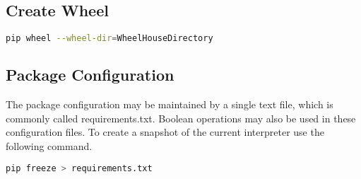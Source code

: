 \subsection{Create Wheel}
\begin{lstlisting}[language=bash, numbers=none]
pip wheel --wheel-dir=WheelHouseDirectory
\end{lstlisting}

\subsection{Package Configuration}
The package configuration may be maintained by a single text file, which is
commonly called requirements.txt. Boolean operations may also be used in these
configuration files. To create a snapshot of the current interpreter use the
following command.
\begin{lstlisting}[language=bash, numbers=none]
pip freeze > requirements.txt
\end{lstlisting}
